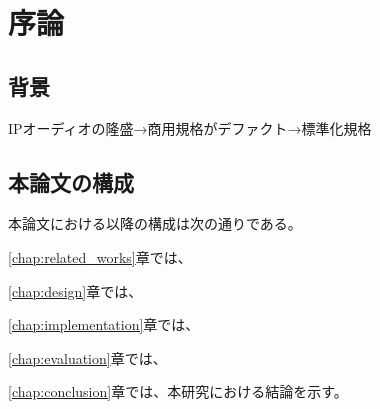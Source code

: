 \chapter{序論}
\label{chap:introduction}

\section{背景}
\label{section:background}

IPオーディオの隆盛→商用規格がデファクト→標準化規格

\section{本論文の構成}

本論文における以降の構成は次の通りである。

\ref{chap:related_works}章では、

\ref{chap:design}章では、

\ref{chap:implementation}章では、

\ref{chap:evaluation}章では、

\ref{chap:conclusion}章では、本研究における結論を示す。
